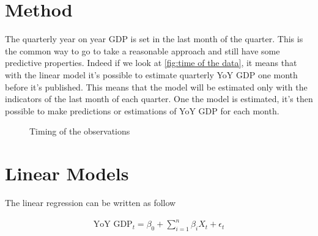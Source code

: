 \documentclass[12pt,a4paper,oneside]{book}
\newcommand{\ImageWidth}{11cm}
\begin{document}
\section{Method}

The quarterly year on year GDP is set in the last month of the quarter. This is the common way to go to take a reasonable approach and still have some predictive properties.
Indeed if we look at \autoref{fig:time of the data}, it means that with the linear model it's possible to estimate quarterly YoY GDP one month before it's published. 
This means that the model will be estimated only with the indicators of the last month of each quarter. One the model is estimated, it's then possible to make predictions or estimations of YoY GDP for each month.


\begin{figure}[H]
     \centering \footnotesize
{}
    \caption{Timing of the observations}
    \label{fig:time of the data}
\end{figure}


\section{Linear Models}

The linear regression can be written as follow

\begin{eqnarray}
    \text{YoY GDP}_{t} = \beta_0 + \sum^n_{i = 1}
       \beta_{i} X_{t} + \epsilon_t 
\end{eqnarray}
\end{document}
